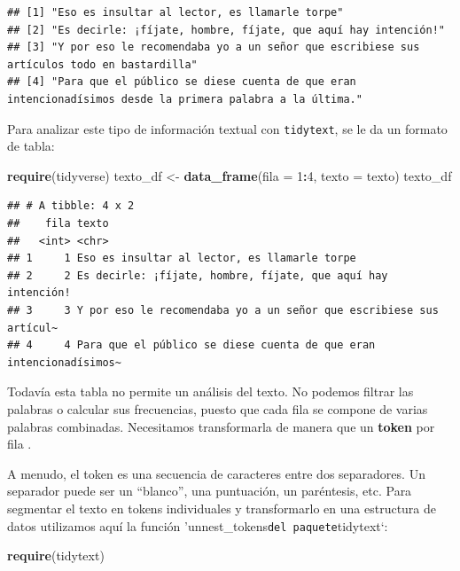 \documentclass[]{article}
\newenvironment{Shaded}{\begin{snugshade}}{\end{snugshade}}
\newcommand{\KeywordTok}[1]{\textcolor[rgb]{0.13,0.29,0.53}{\textbf{#1}}}
\newcommand{\DataTypeTok}[1]{\textcolor[rgb]{0.13,0.29,0.53}{#1}}
\newcommand{\DecValTok}[1]{\textcolor[rgb]{0.00,0.00,0.81}{#1}}
\newcommand{\StringTok}[1]{\textcolor[rgb]{0.31,0.60,0.02}{#1}}
\newcommand{\OperatorTok}[1]{\textcolor[rgb]{0.81,0.36,0.00}{\textbf{#1}}}
\newcommand{\NormalTok}[1]{#1}
\begin{document}
\begin{verbatim}
## [1] "Eso es insultar al lector, es llamarle torpe"                                                           
## [2] "Es decirle: ¡fíjate, hombre, fíjate, que aquí hay intención!"                                           
## [3] "Y por eso le recomendaba yo a un señor que escribiese sus artículos todo en bastardilla"                
## [4] "Para que el público se diese cuenta de que eran intencionadísimos desde la primera palabra a la última."
\end{verbatim}

Para analizar este tipo de información textual con \texttt{tidytext}, se
le da un formato de tabla:

\begin{Shaded}
\begin{Highlighting}[]
\KeywordTok{require}\NormalTok{(tidyverse)}
\NormalTok{texto_df <-}\StringTok{ }\KeywordTok{data_frame}\NormalTok{(}\DataTypeTok{fila =} \DecValTok{1}\OperatorTok{:}\DecValTok{4}\NormalTok{, }\DataTypeTok{texto =}\NormalTok{ texto)}
\NormalTok{texto_df}
\end{Highlighting}
\end{Shaded}

\begin{verbatim}
## # A tibble: 4 x 2
##    fila texto                                                             
##   <int> <chr>                                                             
## 1     1 Eso es insultar al lector, es llamarle torpe                      
## 2     2 Es decirle: ¡fíjate, hombre, fíjate, que aquí hay intención!      
## 3     3 Y por eso le recomendaba yo a un señor que escribiese sus artícul~
## 4     4 Para que el público se diese cuenta de que eran intencionadísimos~
\end{verbatim}

Todavía esta tabla no permite un análisis del texto. No podemos filtrar
las palabras o calcular sus frecuencias, puesto que cada fila se compone
de varias palabras combinadas. Necesitamos transformarla de manera que
un \textbf{token} por fila .

A menudo, el token es una secuencia de caracteres entre dos separadores.
Un separador puede ser un ``blanco'', una puntuación, un paréntesis,
etc. Para segmentar el texto en tokens individuales y transformarlo en
una estructura de datos utilizamos aquí la función
'unnest\_tokens\texttt{del\ paquete}tidytext`:

\begin{Shaded}
\begin{Highlighting}[]
\KeywordTok{require}\NormalTok{(tidytext)}
\end{Highlighting}
\end{Shaded}
\end{document}
